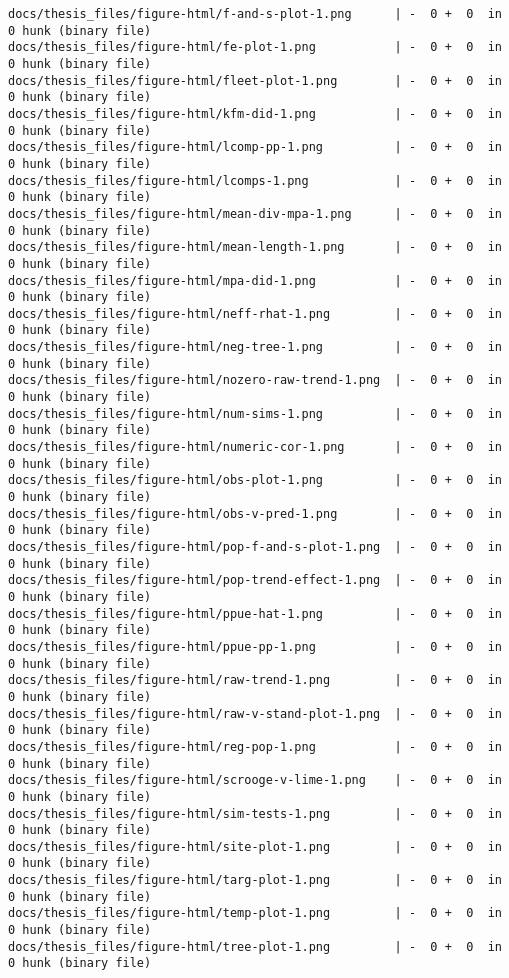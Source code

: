 \documentclass[twoside,12pt,final]{ucthesis-CA2012}
\begin{document}
\begin{ucmainmatter}
\begin{verbatim}
docs/thesis_files/figure-html/f-and-s-plot-1.png      | -  0 +  0  in  0 hunk (binary file)
docs/thesis_files/figure-html/fe-plot-1.png           | -  0 +  0  in  0 hunk (binary file)
docs/thesis_files/figure-html/fleet-plot-1.png        | -  0 +  0  in  0 hunk (binary file)
docs/thesis_files/figure-html/kfm-did-1.png           | -  0 +  0  in  0 hunk (binary file)
docs/thesis_files/figure-html/lcomp-pp-1.png          | -  0 +  0  in  0 hunk (binary file)
docs/thesis_files/figure-html/lcomps-1.png            | -  0 +  0  in  0 hunk (binary file)
docs/thesis_files/figure-html/mean-div-mpa-1.png      | -  0 +  0  in  0 hunk (binary file)
docs/thesis_files/figure-html/mean-length-1.png       | -  0 +  0  in  0 hunk (binary file)
docs/thesis_files/figure-html/mpa-did-1.png           | -  0 +  0  in  0 hunk (binary file)
docs/thesis_files/figure-html/neff-rhat-1.png         | -  0 +  0  in  0 hunk (binary file)
docs/thesis_files/figure-html/neg-tree-1.png          | -  0 +  0  in  0 hunk (binary file)
docs/thesis_files/figure-html/nozero-raw-trend-1.png  | -  0 +  0  in  0 hunk (binary file)
docs/thesis_files/figure-html/num-sims-1.png          | -  0 +  0  in  0 hunk (binary file)
docs/thesis_files/figure-html/numeric-cor-1.png       | -  0 +  0  in  0 hunk (binary file)
docs/thesis_files/figure-html/obs-plot-1.png          | -  0 +  0  in  0 hunk (binary file)
docs/thesis_files/figure-html/obs-v-pred-1.png        | -  0 +  0  in  0 hunk (binary file)
docs/thesis_files/figure-html/pop-f-and-s-plot-1.png  | -  0 +  0  in  0 hunk (binary file)
docs/thesis_files/figure-html/pop-trend-effect-1.png  | -  0 +  0  in  0 hunk (binary file)
docs/thesis_files/figure-html/ppue-hat-1.png          | -  0 +  0  in  0 hunk (binary file)
docs/thesis_files/figure-html/ppue-pp-1.png           | -  0 +  0  in  0 hunk (binary file)
docs/thesis_files/figure-html/raw-trend-1.png         | -  0 +  0  in  0 hunk (binary file)
docs/thesis_files/figure-html/raw-v-stand-plot-1.png  | -  0 +  0  in  0 hunk (binary file)
docs/thesis_files/figure-html/reg-pop-1.png           | -  0 +  0  in  0 hunk (binary file)
docs/thesis_files/figure-html/scrooge-v-lime-1.png    | -  0 +  0  in  0 hunk (binary file)
docs/thesis_files/figure-html/sim-tests-1.png         | -  0 +  0  in  0 hunk (binary file)
docs/thesis_files/figure-html/site-plot-1.png         | -  0 +  0  in  0 hunk (binary file)
docs/thesis_files/figure-html/targ-plot-1.png         | -  0 +  0  in  0 hunk (binary file)
docs/thesis_files/figure-html/temp-plot-1.png         | -  0 +  0  in  0 hunk (binary file)
docs/thesis_files/figure-html/tree-plot-1.png         | -  0 +  0  in  0 hunk (binary file)

\end{verbatim}
\end{ucmainmatter}
\end{document}
